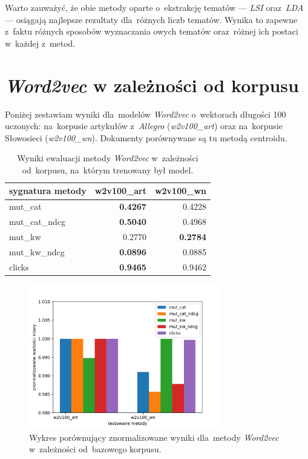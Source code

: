 \documentclass[pl]{minipw} %
\begin{document}
Warto zauważyć, że obie metody oparte o~ekstrakcję tematów --- \textit{LSI} oraz~\textit{LDA} --- osiągają najlepsze rezultaty dla~różnych liczb tematów. Wynika to zapewne z~faktu różnych sposobów wyznaczania owych tematów oraz~różnej ich postaci w~każdej z~metod.


\section{\textit{Word2vec} w zależności od korpusu}

Poniżej zestawiam wyniki dla~modelów \textit{Word2vec} o~wektorach długości 100 uczonych: na~korpusie artykułów z~\textit{Allegro} (\textit{w2v100\_art}) oraz na~korpusie Słowosieci (\textit{w2v100\_wn}). Dokumenty porównywane są tu metodą centroidu.

\begin{table}[H]
	\centering
	\begin{tabular}{lrr}
		\hline
		sygnatura metody &   w2v100\_art &   w2v100\_wn \\
		\hline
		mut\_cat      &       \textbf{0.4267} &      0.4228 \\
		mut\_cat\_ndcg &       \textbf{0.5040}  &      0.4968 \\
		mut\_kw       &       0.2770  &      \textbf{0.2784} \\
		mut\_kw\_ndcg  &       \textbf{0.0896} &      0.0885 \\
		clicks       &       \textbf{0.9465} &      0.9462 \\
		\hline
	\end{tabular}
	\caption{Wyniki ewaluacji metody \textit{Word2vec} w~zależności od~korpusu, na~którym trenowany był model.}
\end{table}

\begin{figure}[H]
	\centering
	\includegraphics[width=0.75\textwidth]{img/results/w2v100_art_w2v100_wn_.png}
\caption{Wykres porównujący znormalizowane wyniki dla~metody \textit{Word2vec} w~zależności od~bazowego korpusu.}
\end{figure}
\end{document}
